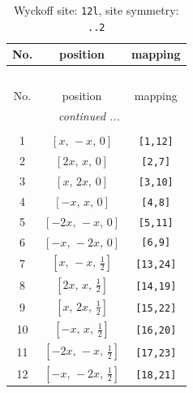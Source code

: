 \documentclass[fleqn,8pt]{jsarticle}
\begin{document}
\begin{longtable}{ccc}
\caption{Wyckoff site: {\tt 12l}, site symmetry: {\tt ..2}}
 \\
 \hline \hline
No. & position & mapping \\ \hline \endfirsthead

\multicolumn{2}{l}{\tablename\ \thetable{}} \\
 \hline \hline
No. & position & mapping \\ \hline \endhead

 \hline \hline
\multicolumn{2}{r}{\footnotesize\it continued ...} \\ \endfoot

 \hline \hline
\multicolumn{2}{r}{} \\ \endlastfoot

1 & $\left[ x,\, - x,\, 0 \right]$ & {\tt [1,12]} \\ \hline
2 & $\left[ 2 x,\, x,\, 0 \right]$ & {\tt [2,7]} \\ \hline
3 & $\left[ x,\, 2 x,\, 0 \right]$ & {\tt [3,10]} \\ \hline
4 & $\left[ - x,\, x,\, 0 \right]$ & {\tt [4,8]} \\ \hline
5 & $\left[ - 2 x,\, - x,\, 0 \right]$ & {\tt [5,11]} \\ \hline
6 & $\left[ - x,\, - 2 x,\, 0 \right]$ & {\tt [6,9]} \\ \hline
7 & $\left[ x,\, - x,\, \frac{1}{2} \right]$ & {\tt [13,24]} \\ \hline
8 & $\left[ 2 x,\, x,\, \frac{1}{2} \right]$ & {\tt [14,19]} \\ \hline
9 & $\left[ x,\, 2 x,\, \frac{1}{2} \right]$ & {\tt [15,22]} \\ \hline
10 & $\left[ - x,\, x,\, \frac{1}{2} \right]$ & {\tt [16,20]} \\ \hline
11 & $\left[ - 2 x,\, - x,\, \frac{1}{2} \right]$ & {\tt [17,23]} \\ \hline
12 & $\left[ - x,\, - 2 x,\, \frac{1}{2} \right]$ & {\tt [18,21]} \\
\end{longtable}
\renewcommand{\arraystretch}{1.2}
\end{document}
